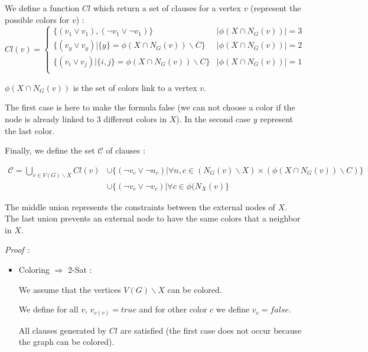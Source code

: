 \documentclass{article}
\theoremstyle{plain}
\begin{document}
\begin{enumerate}
\begin{enumerate}
          We define a function $Cl$ which return a set of clauses for a vertex
          $v$ (represent the possible colors for $v$) :
          \[
            Cl(v) =
            \begin{cases}
              \{(v_1 \vee v_1), (\neg v_1 \vee \neg v_1)\}
              & |\phi(X \cap N_G(v))| = 3  \\
              \{(v_y \vee v_y) | \{y\} = \phi(X \cap N_G(v)) \backslash C\}
              & |\phi(X \cap N_G(v))| = 2 \\
              \{(v_i \vee v_j) | \{i, j\} = \phi(X \cap N_G(v)) \backslash C\}
              & |\phi(X \cap N_G(v))| = 1 \\
            \end{cases}
          \]

          $\phi(X \cap N_G(v))$ is the set of colors link to a vertex $v$.

          The first case is here to make the formula false (we can not choose a
          color if the node is already linked to 3 different colors in $X$).
          In the second case $y$ represent the last color.

          Finally, we define the set $\mathcal C$ of clauses :

          \begin{align*}
            \mathcal C = \bigcup_{v \in V(G) \backslash X} Cl(v) &\cup
            \{(\neg v_c \vee \neg n_c) |\forall n, c \in (N_G(v) \backslash X) \times
            (\phi(X \cap N_G(v)) \backslash C) \} \\
            & \cup \{(\neg v_c \vee \neg v_c) | \forall c \in \phi(N_X(v)\}
          \end{align*}

          The middle union represents the constraints between the external nodes
          of $X$. The last union prevents an external node to have the same
          colors that a neighbor in $X$.

          \textit{Proof :}

          \begin{itemize}
            \item Coloring $\Rightarrow$ 2-Sat :

              We assume that the vertices $V(G) \backslash X$ can be colored.

              We define for all $v$, $v_{c(v)} = true$ and for other color
              $c$ we define $v_c = false$.

              All clauses generated by $Cl$ are
              satisfied (the first case does not occur because the graph can be
              colored).


\end{itemize}
\end{enumerate}
\end{enumerate}
\end{document}
